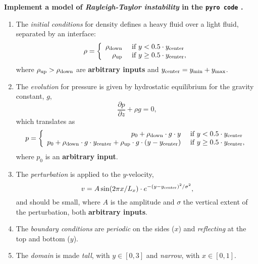 \documentclass[10pt]{article}
\author{\color{purple}{\bf Marina von Steinkirch}}
\title{\color{red}{\bf PHYS 688: Numerical Methods for AstroPhysics \\Homework \#6: 2D Rayleigh-Taylor Instability} }
\begin{document}
\maketitle




{\color{MidnightBlue}
{\bf Implement a model of {\it Rayleigh-Taylor instability} in the  \texttt{pyro code} \cite{pyro}.}}

\quad


\begin{enumerate}
\item The {\it initial conditions} for density defines a heavy fluid over a light fluid, separated by an interface:
$$
\rho = \left\{ \begin{array}{rl}
\rho_{\rm down}  &\mbox{ if } y < 0.5 \cdot y_{\rm center}  \\
 \rho_{\rm up}  &\mbox{ if } y \geq 0.5 \cdot y_{\rm center}  ,
       \end{array} \right.
$$
where $\rho_{\rm up}>\rho_{\rm down}$ are {\bf arbitrary inputs} and $y_{\rm center} = y_{\rm min} + y_{\rm max}$.

\quad


\item The {\it evolution} for pressure is given by hydrostatic equilibrium for the gravity constant, $g$,
$$ \frac{\partial p}{\partial z} + \rho g = 0,$$
which translates as
$$
p = \left\{ \begin{array}{rl}
 p_0 + \rho_{\rm down }\cdot g \cdot y  &\mbox{ if } y< 0.5 \cdot y_{\rm center}  \\
 p_0 + \rho_{\rm down}  \cdot g  \cdot y_{\rm center} + \rho_{\rm up} \cdot g \cdot (y - y_{\rm center})  &\mbox{ if } y \geq 0.5 \cdot y_{\rm center} ,
       \end{array} \right.
$$
where $p_0$ is an {\bf arbitrary input}.

\quad

\item The {\it perturbation} is applied to the $y$-velocity,
$$ v = A \sin(2 \pi x/ L_x) \cdot e^{-(y-y_{\rm center})^2/\sigma^2},$$
and should be small, where $A$ is the amplitude and $\sigma$ the vertical extent of the perturbation, both {\bf arbitrary inputs}.

\quad

\item The {\it boundary conditions} are {\it periodic} on the sides ($x$) and {\it reflecting} at the top and 
bottom ($y$).

\quad

\item The {\it domain} is made {\it tall}, with $y \in [0,3]$ and {\it narrow}, with $x \in [0,1]$.

\end{enumerate}
\end{document}

